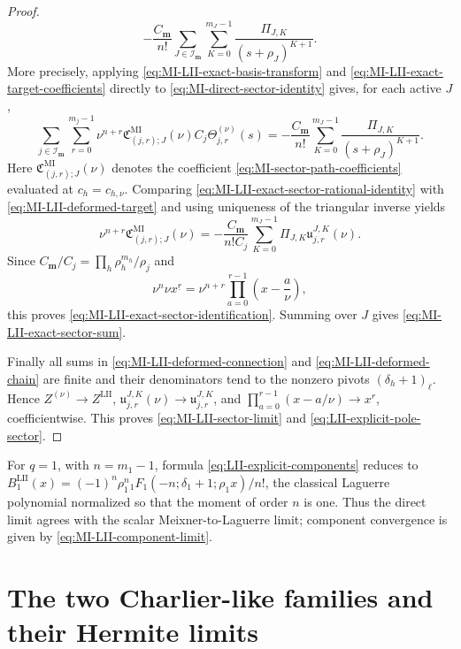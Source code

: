 \documentclass[10pt]{amsart}
\newcommand{\mm}{\boldsymbol m}
\newcommand{\fall}[2]{#1^{\underline{#2}}}
\theoremstyle{plain}
\theoremstyle{definition}
\theoremstyle{remark}
\begin{document}
\begin{proof}
\[
 -\frac{C_{\mm}}{n!}
 \sum_{J\in\mathcal I_{\mm}}\sum_{K=0}^{m_J-1}
 \frac{\Pi_{J,K}}{(s+\rho_J)^{K+1}}.
\]
More precisely, applying \eqref{eq:MI-LII-exact-basis-transform} and
\eqref{eq:MI-LII-exact-target-coefficients} directly to
\eqref{eq:MI-direct-sector-identity} gives, for each active \(J\),
\begin{equation}
 \sum_{j\in\mathcal I_{\mm}}\sum_{r=0}^{m_j-1}
 \nu^{n+r}\mathfrak C_{(j,r);J}^{\mathrm{MI}}(\nu)
 C_j\Theta_{j,r}^{(\nu)}(s)
 =-\frac{C_{\mm}}{n!}\sum_{K=0}^{m_J-1}
 \frac{\Pi_{J,K}}{(s+\rho_J)^{K+1}}.
 \label{eq:MI-LII-exact-sector-rational-identity}
\end{equation}
Here \(\mathfrak C_{(j,r);J}^{\mathrm{MI}}(\nu)\) denotes the coefficient
\eqref{eq:MI-sector-path-coefficients} evaluated at
\(c_h=c_{h,\nu}\). Comparing
\eqref{eq:MI-LII-exact-sector-rational-identity} with
\eqref{eq:MI-LII-deformed-target} and using uniqueness of the triangular
inverse yields
\[
 \nu^{n+r}\mathfrak C_{(j,r);J}^{\mathrm{MI}}(\nu)
 =-\frac{C_{\mm}}{n!C_j}
 \sum_{K=0}^{m_J-1}\Pi_{J,K}
 \mathfrak u_{j,r}^{J,K}(\nu).
\]
Since
\(C_{\mm}/C_j=\prod_h\rho_h^{m_h}/\rho_j\) and
\[
 \nu^n\fall{\nu x}{r}
 =\nu^{n+r}\prod_{a=0}^{r-1}\left(x-\frac a\nu\right),
\]
this proves \eqref{eq:MI-LII-exact-sector-identification}. Summing over
\(J\) gives \eqref{eq:MI-LII-exact-sector-sum}.

Finally all sums in \eqref{eq:MI-LII-deformed-connection} and
\eqref{eq:MI-LII-deformed-chain} are finite and their denominators tend
to the nonzero pivots \((\delta_h+1)_\ell\). Hence
\(Z^{(\nu)}\to Z^{\mathrm{LII}}\),
\(\mathfrak u_{j,r}^{J,K}(\nu)\to\mathfrak u_{j,r}^{J,K}\), and
\(\prod_{a=0}^{r-1}(x-a/\nu)\to x^r\), coefficientwise. This proves
\eqref{eq:MI-LII-sector-limit} and
\eqref{eq:LII-explicit-pole-sector}.
\end{proof}

For \(q=1\), with \(n=m_1-1\), formula
\eqref{eq:LII-explicit-components} reduces to
\(B_1^{\mathrm{LII}}(x)=(-1)^n\rho_1^n
{}_1F_1(-n;\delta_1+1;\rho_1x)/n!\), the classical Laguerre polynomial
normalized so that the moment of order \(n\) is one. Thus the direct limit
agrees with the scalar Meixner-to-Laguerre limit; component convergence is
given by \eqref{eq:MI-LII-component-limit}.

\section{The two Charlier-like families and their Hermite limits}
\label{sec:Charlier-Hermite}
\end{document}
